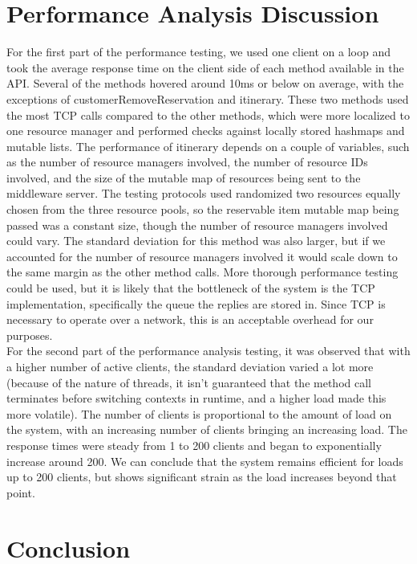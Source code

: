 \documentclass[letterpaper,12pt]{article}
\begin{document}
	\section{Performance Analysis Discussion}
	For the first part of the performance testing, we used one client on a loop and took the average response time on the client side of each method available in the API. Several of the methods hovered around 10ms or below on average, with the exceptions of customerRemoveReservation and itinerary. These two methods used the most TCP calls compared to the other methods, which were more localized to one resource manager and performed checks against locally stored hashmaps and mutable lists. The performance of itinerary depends on a couple of variables, such as the number of resource managers involved, the number of resource IDs involved, and the size of the mutable map of resources being sent to the middleware server. The testing protocols used randomized two resources equally chosen from the three resource pools, so the reservable item mutable map being passed was a constant size, though the number of resource managers involved could vary. The standard deviation for this method was also larger, but if we accounted for the number of resource managers involved it would scale down to the same margin as the other method calls. More thorough performance testing could be used, but it is likely that the bottleneck of the system is the TCP implementation, specifically the queue the replies are stored in. Since TCP is necessary to operate over a network, this is an acceptable overhead for our purposes.\\
	
	For the second part of the performance analysis testing, it was observed that with a higher number of active clients, the standard deviation varied a lot more (because of the nature of threads, it isn't guaranteed that the method call terminates before switching contexts in runtime, and a higher load made this more volatile). The number of clients is proportional to the amount of load on the system, with an increasing number of clients bringing an increasing load. The response times were steady from 1 to 200 clients and began to exponentially increase around 200. We can conclude that the system remains efficient for loads up to 200 clients, but shows significant strain as the load increases beyond that point.
	
	\section{Conclusion}
	
\end{document}
